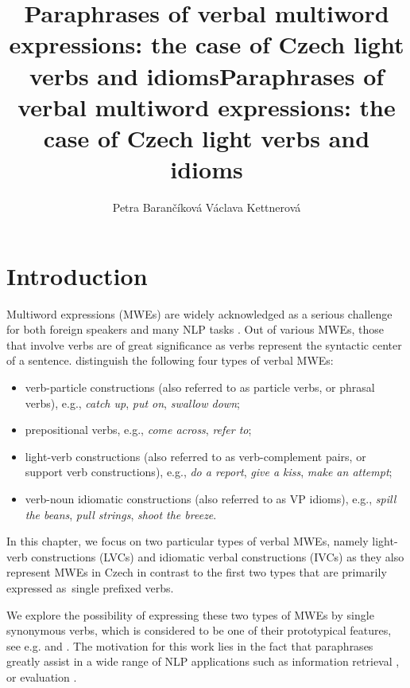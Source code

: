 \documentclass[output=paper
,modfonts
,nonflat]{langsci/langscibook}
\title{Paraphrases of verbal multiword expressions: the case of Czech light verbs and idioms}
\author{%
Petra Barančíková\affiliation{Charles University}\lastand
    Václava Kettnerová\affiliation{Charles University} 
}
\title{Paraphrases of verbal multiword expressions: the case of Czech light verbs and idioms}
\begin{document}

\maketitle

\section{Introduction}

Multiword expressions (MWEs) are widely acknowledged as a serious challenge for 
both foreign speakers and many NLP tasks \citep{Sag2002a}. 
Out of various MWEs, those that involve verbs are of great significance 
as verbs represent the syntactic center of a sentence. \citet{baldwin2010multiword}
distinguish the following four types of verbal MWEs:

\begin{itemize}
\item 
verb-particle constructions (also referred to as particle verbs, or phrasal 
verbs), e.g., \textit{catch up}, \textit{put on}, \textit{swallow down};
\item
prepositional verbs, e.g., \textit{come across}, \textit{refer to};
\item
light-verb constructions (also referred to as verb-complement pairs, or support 
verb constructions), e.g., \textit{do a report}, \textit{give a kiss}, 
\textit{make an attempt}; %
\item
verb-noun idiomatic constructions (also referred to as VP idioms), e.g., 
\textit{spill the beans}, \textit{pull strings}, \textit{shoot the breeze}.
\end{itemize}


In this chapter, we focus on two particular types of  verbal MWEs, namely
light-verb constructions (LVCs) and idiomatic verbal constructions (IVCs) as 
they also represent MWEs in Czech in contrast to the first two types that are 
primarily expressed as~single prefixed verbs. 

We explore the possibility of expressing these two types of MWEs by single 
synonymous verbs, which is considered to be one of their prototypical features, 
see e.g. \citet{chafe-68} and \citet{fillmore-88}. The motivation for this work 
lies in the fact that paraphrases greatly assist in a wide range of NLP 
applications such as information retrieval \citep{wallisinformation}, 
 \citep{Madnani:2013,Callison-Burch:2006,Marton:2009} 
or  evaluation \citep{Kauchak:2006,Zhou:2006,BaRoImprovingEvaluation2014}. 
\end{document}

